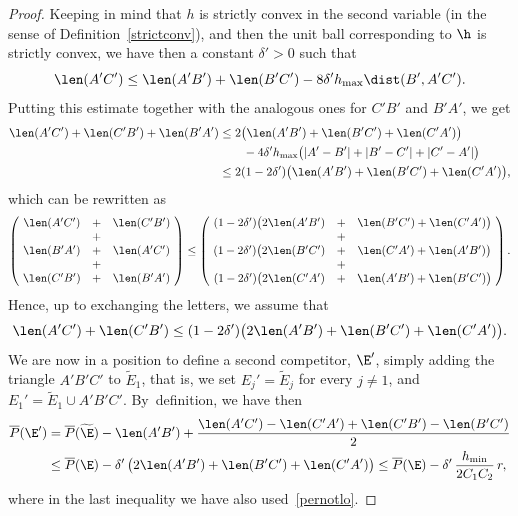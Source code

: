 \begin{proof}
Keeping in mind that $h$ is strictly convex in the second variable (in the sense of Definition~\ref{strictconv}), and then the unit ball corresponding to $\h$ is strictly convex, we have then a constant $\delta'>0$ such that
\[
\len(A'C')\leq \len (A'B')+\len(B'C') - 8\delta' h_{\max} \dist(B',A'C').
\]
Putting this estimate together with the analogous ones for $C'B'$ and $B'A'$, we get
\[\begin{split}
\len(A'C') + \len(C'B')+\len(B'A') &\leq 2\big(\len(A'B')+\len(B'C')+\len(C'A')\big)\\
&\qquad- 4\delta' h_{\max}\big(|A'-B'|+|B'-C'|+|C'-A'|\big)\\
&\leq 2(1-2\delta')\big(\len(A'B')+\len(B'C')+\len(C'A')\big) ,
\end{split}\]
which can be rewritten as
\[
\left(\!
\begin{array}{ccc}
\len(A'C')&+&\len(C'B')\\
&+&\\
\len(B'A')&+&\len(A'C')\\
&+&\\
\len(C'B')&+&\len(B'A')\\
\end{array}
\!\right)
\leq
\left(\!
\begin{array}{ccc}
(1-2\delta') \big(2\len(A'B')&+&\len(B'C')+\len(C'A')\big)\\
&+&\\
(1-2\delta') \big(2\len(B'C')&+&\len(C'A')+\len(A'B')\big)\\
&+&\\
(1-2\delta') \big(2\len(C'A')&+&\len(A'B')+\len(B'C')\big)
\end{array}
\!\right).
\]
Hence, up to exchanging the letters, we assume that
\[
\len(A'C')+\len(C'B') \leq (1-2\delta') \big(2\len(A'B')+\len(B'C')+\len(C'A')\big).
\]
We are now in a position to define a second competitor, $\E'$, simply adding the triangle $A'B'C'$ to $\widetilde E_1$, that is, we set $E_j'=\widetilde E_j$ for every $j\neq 1$, and $E_1'=\widetilde E_1\cup A'B'C'$. By~definition, we have then
\[\begin{split}
\overline P(\E') &= \overline P(\widetilde\E) -\len(A'B')+\frac{\len(A'C')-\len(C'A')+\len(C'B')-\len(B'C') } 2\\
&\leq \overline P(\E) -\delta'\, \big(2\len(A'B')+\len(B'C')+\len(C'A')\big)
\leq \overline P(\E) -\delta'\, \frac{h_{\min}}{2C_1C_2}\,r,
\end{split}\]
where in the last inequality we have also used~\eqref{pernotlo}.


\end{proof}
